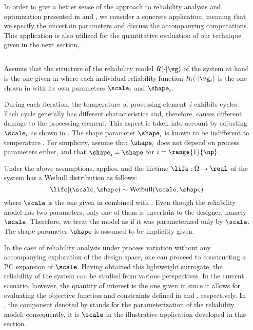 In order to give a better sense of the approach to reliability analysis and
optimization presented in  and
, we consider a concrete application, meaning that we
specify the uncertain parameters and discuss the accompanying computations. This
application is also utilized for the quantitative evaluation of our technique
given in the next section, .

\subsection{\problemtitle}

Assume that the structure of the reliability model $R(\cdot | \vg)$ of the
system at hand is the one given in  where each
individual reliability function $R_i(\cdot | \vg_i)$ is the one shown in
 with its own parameters $\scale_i$ and $\shape_i$.

During each iteration, the temperature of processing element~$i$ exhibits 
cycles. Each cycle generally has different characteristics and, therefore,
causes different damage to the processing element. This aspect is taken into
account by adjusting $\scale_i$ as shown in . The
shape parameter $\shape_i$ is known to be indifferent to temperature
\cite{chang2006}. For simplicity, assume that $\shape_i$ does not depend on
process parameters either, and that $\shape_i = \shape$ for $i =
\range{1}{\np}$.

Under the above assumptions,  applies, and the
lifetime $\life: \Omega \to \real$ of the system has a Weibull distribution as
follows:
\[
  \life | (\scale, \shape) \sim \mathrm{Weibull}(\scale, \shape)
\]
where $\scale$ is the one given in  combined with
. Even though the reliability model has two
parameters, only one of them is uncertain to the designer, namely $\scale$.
Therefore, we treat the model as if it was parameterized only by $\scale$. The
shape parameter $\shape$ is assumed to be implicitly given.

In the case of reliability analysis under process variation without any
accompanying exploration of the design space, one can proceed to constructing a
\ac{PC} expansion of $\scale$. Having obtained this lightweight surrogate, the
reliability of the system can be studied from various perspectives. In the
current scenario, however, the quantity of interest \g is the one given in
 since it allows for evaluating the objective
function and constraints defined in  and
, respectively. In
, the component denoted by \life stands for
the parameterization of the reliability model; consequently, it is $\scale$ in
the illustrative application developed in this section.

